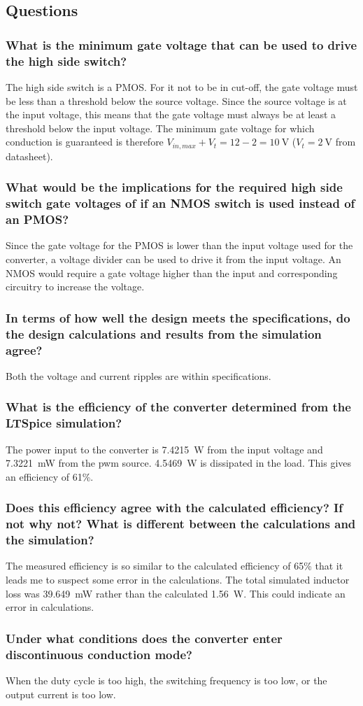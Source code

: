 \subsection{Questions}
\subsubsection{What is the minimum gate voltage that can be used to drive the high side switch?}
The high side switch is a PMOS. For it not to be in cut-off, the gate voltage must be less than a threshold below the source voltage. Since the source voltage is at the input voltage, this means that the gate voltage must always be at least a threshold below the input voltage. The minimum gate voltage for which conduction is guaranteed is therefore $V_{in,max}+V_t=12-2=\SI{10}{\volt}$ ($V_t=\SI{2}{\volt}$ from datasheet).
\subsubsection{What would be the implications for the required high side switch gate voltages of if an NMOS switch is used instead of an PMOS?}
Since the gate voltage for the PMOS is lower than the input voltage used for the converter, a voltage divider can be used to drive it from the input voltage. An NMOS would require a gate voltage higher than the input and corresponding circuitry to increase the voltage.
\subsubsection{In terms of how well the design meets the specifications, do the design calculations and results from the simulation agree?}
Both the voltage and current ripples are within specifications.
\subsubsection{What is the efficiency of the converter determined from the LTSpice simulation?}
The power input to the converter is \SI{7.4215}{\watt} from the input voltage and \SI{7.3221}{\milli\watt} from the pwm source. \SI{4.5469}{\watt} is dissipated in the load. This gives an efficiency of 61\%.  
\subsubsection{Does this efficiency agree with the calculated efficiency? If not why not? What is different between the calculations and the simulation?}
The measured efficiency is so similar to the calculated efficiency of 65\% that it leads me to suspect some error in the calculations.
The total simulated inductor loss was \SI{39.649}{\milli\watt} rather than the calculated \SI{1.56}{\watt}. This could indicate an error in calculations.
\subsubsection{Under what conditions does the converter enter discontinuous conduction mode?}
When the duty cycle is too high, the switching frequency is too low, or the output current is too low.


